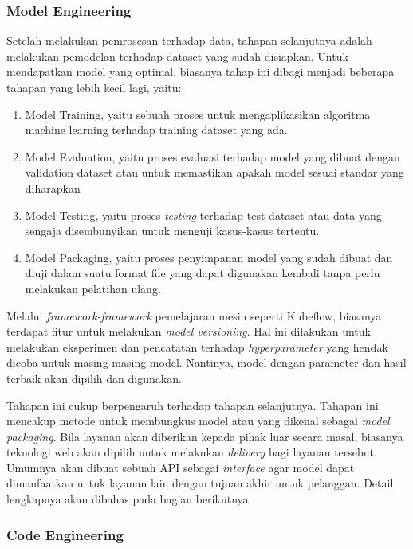 \subsubsection{Model Engineering}

Setelah melakukan pemrosesan terhadap data, tahapan selanjutnya adalah melakukan pemodelan terhadap dataset yang sudah disiapkan.
Untuk mendapatkan model yang optimal, biasanya tahap ini dibagi menjadi beberapa tahapan yang lebih kecil lagi, yaitu:
\begin{enumerate}
  \item Model Training, yaitu sebuah proses untuk mengaplikasikan algoritma machine learning terhadap training dataset yang ada.
  \item Model Evaluation, yaitu proses evaluasi terhadap model yang dibuat dengan validation dataset atau untuk memastikan apakah model sesuai standar yang diharapkan
  \item Model Testing, yaitu proses \textit{testing} terhadap test dataset atau data yang sengaja disembunyikan untuk menguji kasus-kasus tertentu.
  \item Model Packaging, yaitu proses penyimpanan model yang sudah dibuat dan diuji dalam suatu format file yang dapat digunakan kembali tanpa perlu melakukan pelatihan ulang.
\end{enumerate}

Melalui \textit{framework-framework} pemelajaran mesin seperti Kubeflow, biasanya terdapat fitur untuk melakukan \textit{model versioning}.
Hal ini dilakukan untuk melakukan eksperimen dan pencatatan terhadap \textit{hyperparameter} yang hendak dicoba untuk masing-masing model.
Nantinya, model dengan parameter dan hasil terbaik akan dipilih dan digunakan.

Tahapan ini cukup berpengaruh terhadap tahapan selanjutnya.
Tahapan ini mencakup metode untuk membungkus model atau yang dikenal sebagai \textit{model packaging}.
Bila layanan akan diberikan kepada pihak luar secara masal, biasanya teknologi web akan dipilih untuk melakukan \textit{delivery} bagi layanan tersebut.
Umumnya akan dibuat sebuah API sebagai \textit{interface} agar model dapat dimanfaatkan untuk layanan lain dengan tujuan akhir untuk pelanggan. Detail lengkapnya akan dibahas pada bagian berikutnya. 

\subsubsection{Code Engineering}

